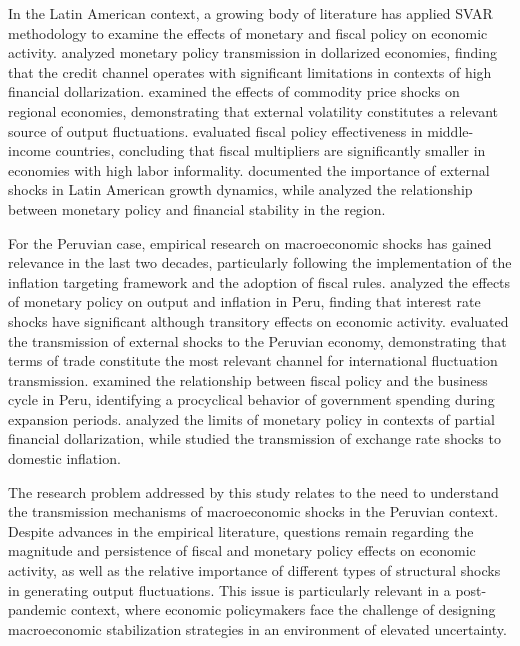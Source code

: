 \documentclass[12pt, a4paper]{article}
\begin{document}
In the Latin American context, a growing body of literature has applied SVAR methodology to examine the effects of monetary and fiscal policy on economic activity. \citet{cespedes2020} analyzed monetary policy transmission in dollarized economies, finding that the credit channel operates with significant limitations in contexts of high financial dollarization. \citet{castillo2020} examined the effects of commodity price shocks on regional economies, demonstrating that external volatility constitutes a relevant source of output fluctuations. \citet{fernandez2021} evaluated fiscal policy effectiveness in middle-income countries, concluding that fiscal multipliers are significantly smaller in economies with high labor informality. \citet{morenobrid2019} documented the importance of external shocks in Latin American growth dynamics, while \citet{ocampo2020} analyzed the relationship between monetary policy and financial stability in the region.

For the Peruvian case, empirical research on macroeconomic shocks has gained relevance in the last two decades, particularly following the implementation of the inflation targeting framework and the adoption of fiscal rules. \citet{mendoza2018} analyzed the effects of monetary policy on output and inflation in Peru, finding that interest rate shocks have significant although transitory effects on economic activity. \citet{castillowinkelried2019} evaluated the transmission of external shocks to the Peruvian economy, demonstrating that terms of trade constitute the most relevant channel for international fluctuation transmission. \citet{humala2020} examined the relationship between fiscal policy and the business cycle in Peru, identifying a procyclical behavior of government spending during expansion periods. \citet{dancourt2021} analyzed the limits of monetary policy in contexts of partial financial dollarization, while \citet{leon2022} studied the transmission of exchange rate shocks to domestic inflation.

The research problem addressed by this study relates to the need to understand the transmission mechanisms of macroeconomic shocks in the Peruvian context. Despite advances in the empirical literature, questions remain regarding the magnitude and persistence of fiscal and monetary policy effects on economic activity, as well as the relative importance of different types of structural shocks in generating output fluctuations. This issue is particularly relevant in a post-pandemic context, where economic policymakers face the challenge of designing macroeconomic stabilization strategies in an environment of elevated uncertainty.
\end{document}
